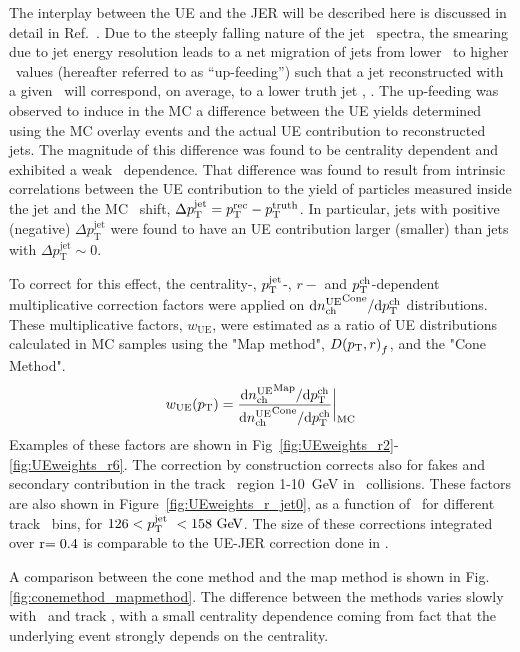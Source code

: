 The interplay between the UE and the JER will be described here is discussed in detail in Ref.~\cite{ATLAS-COM-PHYS-2012-1653}. Due to the steeply falling nature of the jet \pt\ spectra, the smearing due to jet energy resolution leads to a net migration of jets from lower \pt\ to higher \pt\ values (hereafter referred to as ``up-feeding'') such that a jet reconstructed with a given \pTrec\ will correspond, on average, to a lower truth jet \pT, \avgpttrue. The up-feeding was observed to induce in the MC a difference between the UE yields determined using the MC overlay events and the actual UE contribution to reconstructed jets. The magnitude of this difference was found to be centrality dependent and exhibited a weak \pTjet\ dependence.
That difference was found to result from intrinsic correlations between the UE contribution to the yield of particles measured inside the jet and the MC \pTjet\ shift, $\Delta p_{\mathrm{T}}^{\mathrm{jet}}= \mbox{$p_{{\mathrm{T}}}^{\mathrm{rec}}$} - \mbox{$p_{\mathrm{T}}^{\mathrm{truth}}$}$.  In particular, jets with positive (negative) $\Delta p_{\mathrm{T}}^{\mathrm{jet}}$ were found to have an UE contribution larger (smaller) than jets with $\Delta p_{\mathrm{T}}^{\mathrm{jet}} \sim 0$.  
 
  To correct for this effect, the centrality-, $\mbox{$p_{\mathrm{T}}^{\mathrm{jet}}$}$-, $r-$ and $\mbox{$p_{{\mathrm{T}}}^{\mathrm{ch}}$}$-dependent multiplicative correction factors were applied on $\mathrm{d} \mbox{$n_{\mathrm{ch}}^{\mathrm{UE}}$}^{\mathrm{Cone}}/ \mathrm{d} \mbox{$p_{{\mathrm{T}}}^{\mathrm{ch}}$}$ distributions. 
  These multiplicative factors, $w_{\mathrm{UE}}$, were estimated as a ratio of UE distributions calculated in MC samples using the "Map method", $\mbox{$D( p_{\mathrm{T}}, r)$}_{f}$, and the "Cone Method".
  \begin{eqnarray}
  w_{\mathrm{UE}} (p_{\mathrm{T}}) = \frac{\mathrm{d} \mbox{$n_{\mathrm{ch}}^{\mathrm{UE}}$}^{\mathrm{Map}}/ \mathrm{d} \mbox{$p_{{\mathrm{T}}}^{\mathrm{ch}}$}}{\mathrm{d} \mbox{$n_{\mathrm{ch}}^{\mathrm{UE}}$}^{\mathrm{Cone}}/ \mathrm{d} \mbox{$p_{{\mathrm{T}}}^{\mathrm{ch}}$}}\bigg|_{\mathrm{MC}}
  \end{eqnarray}   
Examples of these factors are shown in Fig~\ref{fig:UEweights_r2}-\ref{fig:UEweights_r6}. The correction by construction corrects also for fakes and secondary contribution in the track \pT\ region 1-10~GeV in \PbPb\ collisions. These factors are also shown in Figure~\ref{fig:UEweights_r_jet0}, as a function of \rvar\ for different track \pt\ bins, for $126 < \ptjet\ < 158 \GeV$.  The size of these corrections integrated over $\rvar = 0.4$ is comparable to the UE-JER correction done in \cite{ATLAS502FFConf}.

A comparison between the cone method and the map method is shown in Fig.\ref{fig:conemethod_mapmethod}. The difference between the methods varies slowly with \ptjet\ and track \pT, with a small centrality dependence coming from fact that the underlying event strongly depends on the centrality.


